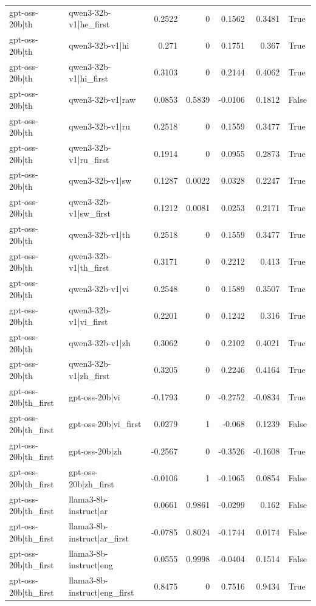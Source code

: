 \begin{table}
\begin{tabular}{l l r r r r l}
gpt-oss-20b|th & qwen3-32b-v1|he_first & 0.2522 & 0 & 0.1562 & 0.3481 & True \\
gpt-oss-20b|th & qwen3-32b-v1|hi & 0.271 & 0 & 0.1751 & 0.367 & True \\
gpt-oss-20b|th & qwen3-32b-v1|hi_first & 0.3103 & 0 & 0.2144 & 0.4062 & True \\
gpt-oss-20b|th & qwen3-32b-v1|raw & 0.0853 & 0.5839 & -0.0106 & 0.1812 & False \\
gpt-oss-20b|th & qwen3-32b-v1|ru & 0.2518 & 0 & 0.1559 & 0.3477 & True \\
gpt-oss-20b|th & qwen3-32b-v1|ru_first & 0.1914 & 0 & 0.0955 & 0.2873 & True \\
gpt-oss-20b|th & qwen3-32b-v1|sw & 0.1287 & 0.0022 & 0.0328 & 0.2247 & True \\
gpt-oss-20b|th & qwen3-32b-v1|sw_first & 0.1212 & 0.0081 & 0.0253 & 0.2171 & True \\
gpt-oss-20b|th & qwen3-32b-v1|th & 0.2518 & 0 & 0.1559 & 0.3477 & True \\
gpt-oss-20b|th & qwen3-32b-v1|th_first & 0.3171 & 0 & 0.2212 & 0.413 & True \\
gpt-oss-20b|th & qwen3-32b-v1|vi & 0.2548 & 0 & 0.1589 & 0.3507 & True \\
gpt-oss-20b|th & qwen3-32b-v1|vi_first & 0.2201 & 0 & 0.1242 & 0.316 & True \\
gpt-oss-20b|th & qwen3-32b-v1|zh & 0.3062 & 0 & 0.2102 & 0.4021 & True \\
gpt-oss-20b|th & qwen3-32b-v1|zh_first & 0.3205 & 0 & 0.2246 & 0.4164 & True \\
gpt-oss-20b|th_first & gpt-oss-20b|vi & -0.1793 & 0 & -0.2752 & -0.0834 & True \\
gpt-oss-20b|th_first & gpt-oss-20b|vi_first & 0.0279 & 1 & -0.068 & 0.1239 & False \\
gpt-oss-20b|th_first & gpt-oss-20b|zh & -0.2567 & 0 & -0.3526 & -0.1608 & True \\
gpt-oss-20b|th_first & gpt-oss-20b|zh_first & -0.0106 & 1 & -0.1065 & 0.0854 & False \\
gpt-oss-20b|th_first & llama3-8b-instruct|ar & 0.0661 & 0.9861 & -0.0299 & 0.162 & False \\
gpt-oss-20b|th_first & llama3-8b-instruct|ar_first & -0.0785 & 0.8024 & -0.1744 & 0.0174 & False \\
gpt-oss-20b|th_first & llama3-8b-instruct|eng & 0.0555 & 0.9998 & -0.0404 & 0.1514 & False \\
gpt-oss-20b|th_first & llama3-8b-instruct|eng_first & 0.8475 & 0 & 0.7516 & 0.9434 & True \\

\end{tabular}
\end{table}
